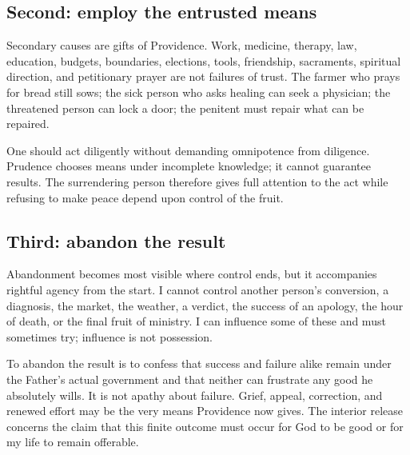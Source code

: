 \subsection{Second: employ the entrusted means}

Secondary causes are gifts of Providence. Work, medicine, therapy, law, education, budgets, boundaries, elections, tools, friendship, sacraments, spiritual direction, and petitionary prayer are not failures of trust. The farmer who prays for bread still sows; the sick person who asks healing can seek a physician; the threatened person can lock a door; the penitent must repair what can be repaired.

One should act diligently without demanding omnipotence from diligence. Prudence chooses means under incomplete knowledge; it cannot guarantee results. The surrendering person therefore gives full attention to the act while refusing to make peace depend upon control of the fruit.

\subsection{Third: abandon the result}

Abandonment becomes most visible where control ends, but it accompanies rightful agency from the start. I cannot control another person's conversion, a diagnosis, the market, the weather, a verdict, the success of an apology, the hour of death, or the final fruit of ministry. I can influence some of these and must sometimes try; influence is not possession.

To abandon the result is to confess that success and failure alike remain under the Father's actual government and that neither can frustrate any good he absolutely wills. It is not apathy about failure. Grief, appeal, correction, and renewed effort may be the very means Providence now gives. The interior release concerns the claim that this finite outcome must occur for God to be good or for my life to remain offerable.

